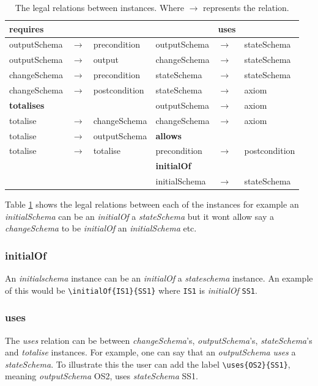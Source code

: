 \begin{table}[H]
\begin{tabular}{|lll||lll|}
\hline
\textbf{requires} & & &  & \textbf{uses} & \\
\hline
outputSchema & $\longrightarrow$ & precondition  & outputSchema &
$\longrightarrow$ & stateSchema\\
outputSchema & $\longrightarrow$ & output & changeSchema & $\longrightarrow$ &
stateSchema \\
changeSchema & $\longrightarrow$ & precondition  & stateSchema &
$\longrightarrow$ & stateSchema \\
changeSchema & $\longrightarrow$ & postcondition  & stateSchema &
$\longrightarrow$ & axiom \\
\cline{1-3}
\textbf{totalises} & &  & outputSchema & $\longrightarrow$ & axiom \\
\cline{1-3}
totalise & $\longrightarrow$ & changeSchema  & changeSchema & $\longrightarrow$
& axiom \\
\cline{4-6}
totalise & $\longrightarrow$ & outputSchema & \textbf{allows}  & & \\
\cline{4-6}
totalise & $\longrightarrow$ & totalise  & precondition  & $\longrightarrow$  &
postcondition \\
\cline{4-6}
& &  & \textbf{initialOf} &  &  \\ 
\cline{4-6}
& &  & initialSchema & $\longrightarrow$ & stateSchema \\ 
\hline
\end{tabular}
\caption{\label{tab:relationsallowed} The legal relations between instances. Where $\longrightarrow$ represents the relation.}
\end{table}

Table \ref{tab:relationsallowed} shows the legal relations between each of the
instances for example an \emph{initialSchema} can be an \emph{initialOf} a
\emph{stateSchema} but it wont allow say a \emph{changeSchema} to be
\emph{initialOf} an \emph{initialSchema} etc.

\subsubsection{initialOf}

An \emph{initialschema} instance can be an \emph{initialOf} a \emph{stateschema}
instance. An example of this would be \verb|\initialOf{IS1}{SS1}| where
\verb|IS1| is \emph{initialOf} \verb|SS1|.

\subsubsection{uses}
The \emph{uses} relation can be between \emph{changeSchema}'s,
\emph{outputSchema}'s, \emph{stateSchema}'s and \emph{totalise} instances. For
example, one can say that an \emph{outputSchema} \emph{uses} a
\emph{stateSchema}. To illustrate this the user can add the label
\verb|\uses{OS2}{SS1}|, meaning \emph{outputSchema} OS2, uses \emph{stateSchema}
SS1.

